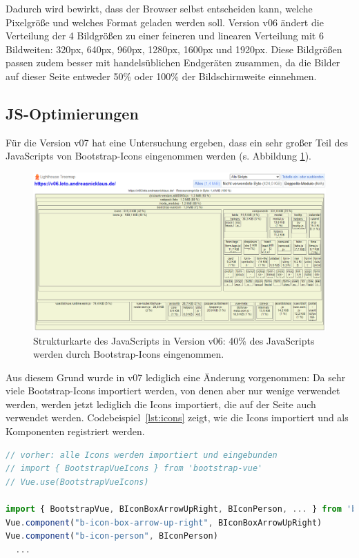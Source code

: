 \documentclass[11pt,a4paper]{article}
\begin{document}
Dadurch wird bewirkt, dass der Browser selbst entscheiden kann, welche Pixelgröße und welches Format geladen werden soll.
Version v06 ändert die Verteilung der 4 Bildgrößen zu einer feineren und linearen Verteilung mit 6 Bildweiten: 320px, 640px, 960px, 1280px, 1600px und 1920px.
Diese Bildgrößen passen zudem besser mit handelsüblichen Endgeräten zusammen, da die Bilder auf dieser Seite entweder 50\% oder 100\% der Bildschirmweite einnehmen.   

\subsection{JS-Optimierungen}
Für die Version v07 hat eine Untersuchung ergeben, dass ein sehr großer Teil des JavaScripts von Bootstrap-Icons eingenommen werden (s. Abbildung \ref{fig:treemap}).

\begin{figure}[h]
  \centering
  \includegraphics[scale=.5]{images/v06_treemap.png}
  \caption{Strukturkarte des JavaScripts in Version v06: 40\% des JavaScripts werden durch Bootstrap-Icons eingenommen.}
  \label{fig:treemap}
\end{figure}

Aus diesem Grund wurde in v07 lediglich eine Änderung vorgenommen: Da sehr viele Bootstrap-Icons importiert werden, von denen aber nur wenige verwendet werden, werden jetzt lediglich die Icons importiert, die auf der Seite auch verwendet werden.
Codebeispiel~\ref{lst:icons} zeigt, wie die Icons importiert und als Komponenten registriert werden.

\begin{lstlisting}[language=JavaScript, caption={Epliziter Import und Einbindung von Bootstrap-Icons}, label={lst:icons}]
// vorher: alle Icons werden importiert und eingebunden
// import { BootstrapVueIcons } from 'bootstrap-vue'
// Vue.use(BootstrapVueIcons)

import { BootstrapVue, BIconBoxArrowUpRight, BIconPerson, ... } from 'bootstrap-vue'
Vue.component("b-icon-box-arrow-up-right", BIconBoxArrowUpRight)
Vue.component("b-icon-person", BIconPerson)
  ...
\end{lstlisting}
\end{document}
